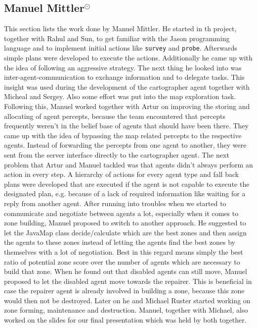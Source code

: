\subsection[Manuel Mittler]{Manuel Mittler$^{\odot}$}
This section lists the work done by Manuel Mittler.
He started in th project, together with Rahul and Sun, to get familiar with the Jason programming language and to implement initial actions like \texttt{survey} and \texttt{probe}.
Afterwards simple plans were developed to execute the actions.
Additionally he came up with the idea of following an aggressive strategy.
The next thing he looked into was inter-agent-communication to exchange information and to delegate tasks.
This insight was used during the development of the cartographer agent together with Micheal and Sergey.
Also some effort was put into the map exploration task.
Following this, Manuel worked together with Artur on improving the storing and allocating of agent percepts, because the team encountered that percepts frequently weren't in the belief base of agents that should have been there. They came up with the idea of bypassing the map related percepts to the respective agents. Instead of forwarding the percepts from one agent to another, they were sent from the server interface directly to the cartographer agent.
The next problem that Artur and Manuel tackled was that agents didn't always perform an action in every step. A hierarchy of actions for every agent type and fall back plans were developed that are executed if the agent is not capable to execute the designated plan, e.g. because of a lack of required information like waiting for a reply from another agent.
After running into troubles when we started to communicate and negotiate between agents a lot, especially when it comes to zone building, Manuel proposed to switch to another approach.
He suggested to let the JavaMap class decide/calculate which are the best zones and then assign the agents to these zones instead of letting the agents find the best zones by themselves with a lot of negotiation.
Best in this regard means simply the best ratio of potential zone score over the number of agents which are necessary to build that zone.
When he found out that disabled agents can still move, Manuel proposed to let the disabled agent move towards the repairer.
This is beneficial in case the repairer agent is already involved in building a zone, because this zone would then not be destroyed.
Later on he and Michael Ruster started working on zone forming, maintenance and destruction.
Manuel, together with Michael, also worked on the slides for our final presentation which was held by both together.
